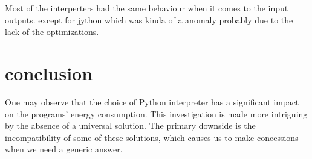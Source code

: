 Most of the interperters had the same behaviour when it comes to the input outputs. except for jython which was kinda of a anomaly probably due to the lack of the optimizations.


\section{conclusion}
One may observe that the choice of Python interpreter has a significant impact on the programs' energy consumption.
This investigation is made more intriguing by the absence of a universal solution.
The primary downside is the incompatibility of some of these solutions, which causes us to make concessions when we need a generic answer.



